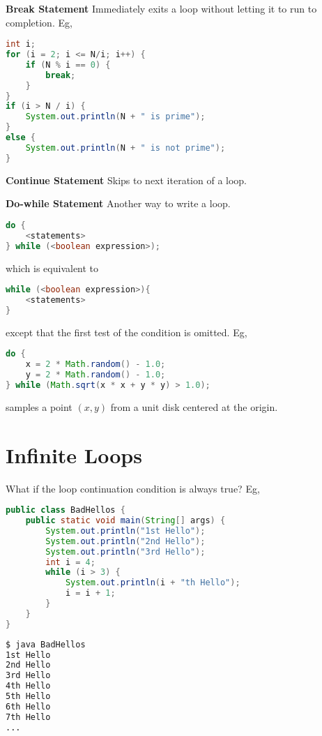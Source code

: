 \documentclass[8pt,a4paper,compress]{beamer}
\begin{document}
\begin{frame}[fragile]
\pause

\textbf{Break Statement} Immediately exits a loop without letting it to run to completion. Eg,
\begin{lstlisting}[language=Java]
int i;
for (i = 2; i <= N/i; i++) {
    if (N % i == 0) {
        break;
    }
}
if (i > N / i) {
    System.out.println(N + " is prime");
}
else {
    System.out.println(N + " is not prime");
}
\end{lstlisting}

\pause
\smallskip

\textbf{Continue Statement} Skips to next iteration of a loop.

\pause
\smallskip

\textbf{Do-while Statement} Another way to write a loop.

\begin{lstlisting}[language=Java]
do {
    <statements>
} while (<boolean expression>);
\end{lstlisting}
which is equivalent to 
\begin{lstlisting}[language=Java]
while (<boolean expression>){
    <statements>
}
\end{lstlisting}
except that the first test of the condition is omitted. Eg,
\begin{lstlisting}[language=Java]
do {
    x = 2 * Math.random() - 1.0;
    y = 2 * Math.random() - 1.0;     
} while (Math.sqrt(x * x + y * y) > 1.0);
\end{lstlisting}
samples a point $(x, y)$ from a unit disk centered at the origin.
\end{frame}

\section{Infinite Loops}
\begin{frame}[fragile]
\pause

What if the loop continuation condition is always true? Eg, 
\begin{lstlisting}[language=Java]
public class BadHellos {
    public static void main(String[] args) {
        System.out.println("1st Hello");
        System.out.println("2nd Hello");
        System.out.println("3rd Hello");
        int i = 4;
        while (i > 3) {
            System.out.println(i + "th Hello");
            i = i + 1;
        }
    }
}
\end{lstlisting}

\pause

\begin{lstlisting}[language=bash]
$ java BadHellos
1st Hello
2nd Hello
3rd Hello
4th Hello
5th Hello
6th Hello
7th Hello
...
\end{lstlisting}

\end{frame}
\end{document}
